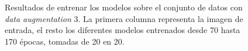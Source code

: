 \begin{figure}[H]
\centering
    \caption{Resultados de entrenar los modelos sobre el conjunto de datos con \textit{data augmentation} 3. La primera columna representa la imagen de entrada, el resto los diferentes modelos entrenados desde 70 hasta 170 épocas, tomadas de 20 en 20.}
    \label{fig:synthetic_molecules_aug3}
\end{figure}

